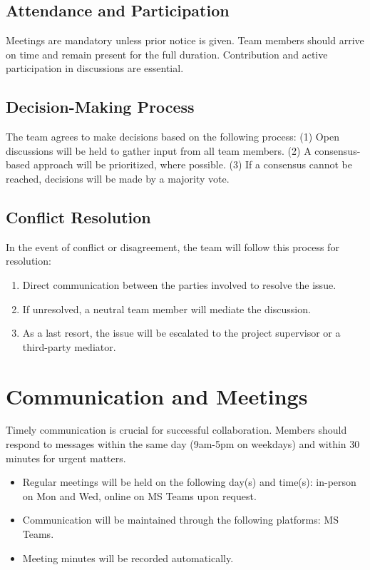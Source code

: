 \documentclass[12pt]{article}
\begin{document}
\subsection{Attendance and Participation}
Meetings are mandatory unless prior notice is given. Team members should arrive on time and remain present for the full duration. Contribution and active participation in discussions are essential.

\subsection{Decision-Making Process}
The team agrees to make decisions based on the following process: (1) Open discussions will be held to gather input from all team members. (2) A consensus-based approach will be prioritized, where possible. (3) If a consensus cannot be reached, decisions will be made by a majority vote.

\subsection{Conflict Resolution}
In the event of conflict or disagreement, the team will follow this process for resolution:
\begin{enumerate}
    \item Direct communication between the parties involved to resolve the issue.
    \item If unresolved, a neutral team member will mediate the discussion.
    \item As a last resort, the issue will be escalated to the project supervisor or a third-party mediator.
\end{enumerate}

\section{Communication and Meetings}
Timely communication is crucial for successful collaboration. Members should respond to messages within the same day (9am-5pm on weekdays) and within 30 minutes for urgent matters.
\begin{itemize}
    \item Regular meetings will be held on the following day(s) and time(s): in-person on Mon and Wed, online on MS Teams upon request.
    \item Communication will be maintained through the following platforms: MS Teams.
    \item Meeting minutes will be recorded automatically.
\end{itemize}
\end{document}
